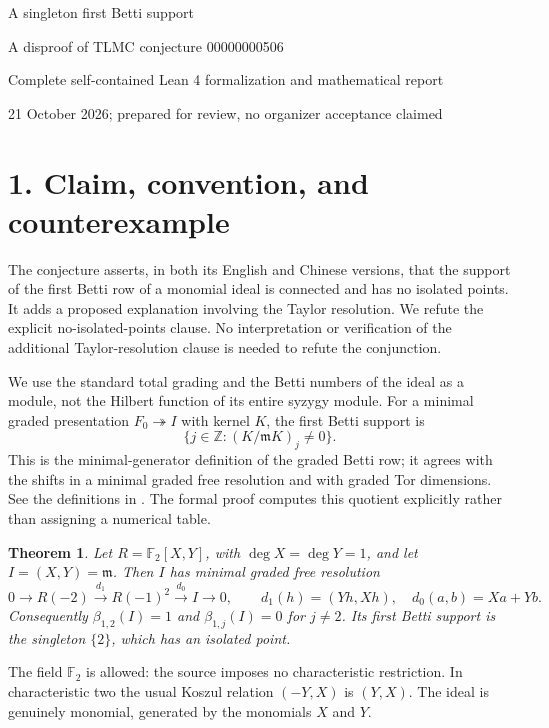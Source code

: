 \documentclass[11pt]{article}
\newtheorem{theorem}{Theorem}
\newcommand{\F}{\mathbb F_2}
\newcommand{\m}{\mathfrak m}
\newcommand{\id}{00000000506}
\begin{document}
\begin{center}
{\LARGE A singleton first Betti support}\par\vspace{5pt}
{\large A disproof of TLMC conjecture \id}\par\vspace{5pt}
{\small Complete self-contained Lean 4 formalization and mathematical report}\par
{\small 21 October 2026; prepared for review, no organizer acceptance claimed}
\end{center}

\section*{1. Claim, convention, and counterexample}
The conjecture asserts, in both its English and Chinese versions, that the
support of the first Betti row of a monomial ideal is connected and has no
isolated points. It adds a proposed explanation involving the Taylor
resolution. We refute the explicit no-isolated-points clause. No interpretation
or verification of the additional Taylor-resolution clause is needed to refute
the conjunction.

We use the standard total grading and the Betti numbers of the ideal as a
module, not the Hilbert function of its entire syzygy module. For a minimal
graded presentation $F_0\twoheadrightarrow I$ with kernel $K$, the first Betti
support is
\[
 \{j\in\mathbb Z:(K/\m K)_j\ne0\}.
\]
This is the minimal-generator definition of the graded Betti row; it agrees
with the shifts in a minimal graded free resolution and with graded Tor
dimensions. See the definitions in \cite{madden,eisenbud}. The formal proof
computes this quotient explicitly rather than assigning a numerical table.

\begin{theorem}
Let $R=\F[X,Y]$, with $\deg X=\deg Y=1$, and let $I=(X,Y)=\m$.
Then $I$ has minimal graded free resolution
\[
 0\longrightarrow R(-2)\xrightarrow{\ d_1\ }
 R(-1)^2\xrightarrow{\ d_0\ }I\longrightarrow0,
 \qquad d_1(h)=(Yh,Xh),\quad d_0(a,b)=Xa+Yb.
\]
Consequently $\beta_{1,2}(I)=1$ and $\beta_{1,j}(I)=0$ for $j\ne2$.
Its first Betti support is the singleton $\{2\}$, which has an isolated point.
\end{theorem}

The field $\F$ is allowed: the source imposes no characteristic restriction.
In characteristic two the usual Koszul relation $(-Y,X)$ is $(Y,X)$.
The ideal is genuinely monomial, generated by the monomials $X$ and $Y$.
\end{document}
